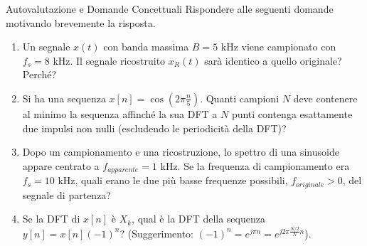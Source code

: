 
\begin{esercizio}{Autovalutazione e Domande Concettuali}
    Rispondere alle seguenti domande motivando brevemente la risposta.
    
    \begin{enumerate}
        \item Un segnale $x(t)$ con banda massima $B=5$ kHz viene campionato con $f_s = 8$ kHz. Il segnale ricostruito $x_R(t)$ sarà identico a quello originale? Perché?
        
        \item Si ha una sequenza $x[n] = \cos(2\pi \frac{n}{5})$. Quanti campioni $N$ deve contenere al minimo la sequenza affinché la sua DFT a $N$ punti contenga esattamente due impulsi non nulli (escludendo le periodicità della DFT)?
        
        \item Dopo un campionamento e una ricostruzione, lo spettro di una sinusoide appare centrato a $f_{apparente} = 1$ kHz. Se la frequenza di campionamento era $f_s = 10$ kHz, quali erano le due più basse frequenze possibili, $f_{originale} > 0$, del segnale di partenza?
        
        \item Se la DFT di $x[n]$ è $X_k$, qual è la DFT della sequenza $y[n]=x[n](-1)^n$? 
        (Suggerimento: $(-1)^n = e^{j\pi n} = e^{j2\pi \frac{N/2}{N} n}$).
    \end{enumerate}
\end{esercizio}